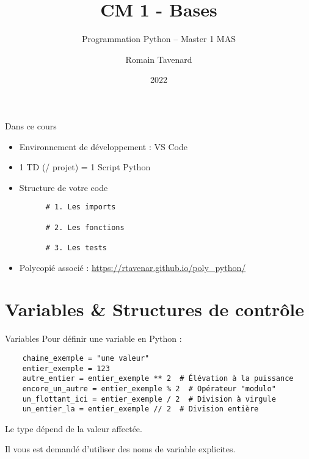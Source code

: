 \documentclass[10pt]{beamer}
\title[M1 MAS -- Python -- Bases]{CM 1 - Bases}
\subtitle{Programmation Python -- Master 1 MAS}
\author{Romain Tavenard}
\date{2022}
\institute{%
\hypersetup{urlcolor=.}
\makebox[2.2ex][c]{\faEnvelope}\enspace\href{mailto:romain.tavenard@univ-rennes2.fr}{\texttt{romain.tavenard@univ-rennes2.fr}}\\%
}
\begin{document}
\maketitle

\begin{frame}[fragile]{Dans ce cours}  
  \begin{itemize}
    \item Environnement de développement : VS Code
    \item 1 TD (/ projet) = 1 Script Python
    \item Structure de votre code
    \begin{beamercodeblock}
      \begin{verbatim}
      # 1. Les imports
  
      # 2. Les fonctions
  
      # 3. Les tests
      \end{verbatim}
    \end{beamercodeblock}
    \item Polycopié associé : \url{https://rtavenar.github.io/poly_python/}
  \end{itemize}

\end{frame}

\section{Variables \& Structures de contrôle}

\begin{frame}[fragile]{Variables}  
  Pour définir une variable en Python :
  \begin{beamercodeblock}
    \begin{verbatim}
    chaine_exemple = "une valeur"
    entier_exemple = 123
    autre_entier = entier_exemple ** 2  # Élévation à la puissance
    encore_un_autre = entier_exemple % 2  # Opérateur "modulo"
    un_flottant_ici = entier_exemple / 2  # Division à virgule
    un_entier_la = entier_exemple // 2  # Division entière
    \end{verbatim}
  \end{beamercodeblock}
  Le type dépend de la valeur affectée.

  Il vous est demandé d'utiliser des \alert{noms de variable explicites}.
\end{frame}
\end{document}

